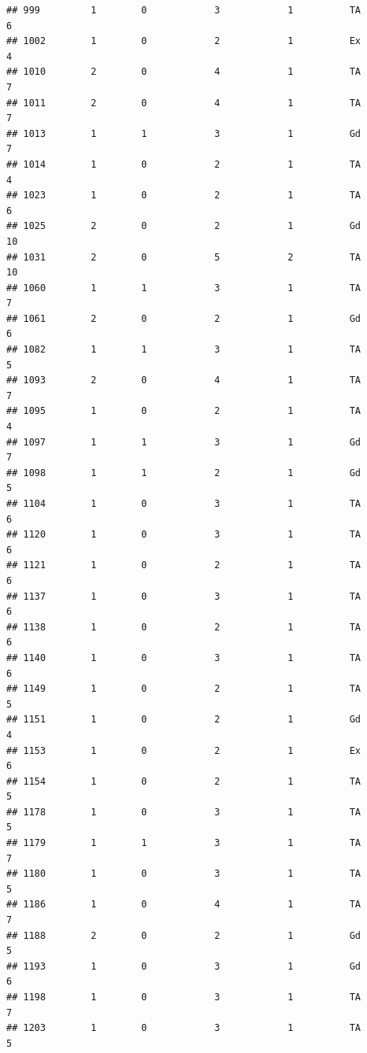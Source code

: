 \documentclass[]{article}
\begin{document}
\begin{verbatim}
## 999         1        0            3            1          TA            6
## 1002        1        0            2            1          Ex            4
## 1010        2        0            4            1          TA            7
## 1011        2        0            4            1          TA            7
## 1013        1        1            3            1          Gd            7
## 1014        1        0            2            1          TA            4
## 1023        1        0            2            1          TA            6
## 1025        2        0            2            1          Gd           10
## 1031        2        0            5            2          TA           10
## 1060        1        1            3            1          TA            7
## 1061        2        0            2            1          Gd            6
## 1082        1        1            3            1          TA            5
## 1093        2        0            4            1          TA            7
## 1095        1        0            2            1          TA            4
## 1097        1        1            3            1          Gd            7
## 1098        1        1            2            1          Gd            5
## 1104        1        0            3            1          TA            6
## 1120        1        0            3            1          TA            6
## 1121        1        0            2            1          TA            6
## 1137        1        0            3            1          TA            6
## 1138        1        0            2            1          TA            6
## 1140        1        0            3            1          TA            6
## 1149        1        0            2            1          TA            5
## 1151        1        0            2            1          Gd            4
## 1153        1        0            2            1          Ex            6
## 1154        1        0            2            1          TA            5
## 1178        1        0            3            1          TA            5
## 1179        1        1            3            1          TA            7
## 1180        1        0            3            1          TA            5
## 1186        1        0            4            1          TA            7
## 1188        2        0            2            1          Gd            5
## 1193        1        0            3            1          Gd            6
## 1198        1        0            3            1          TA            7
## 1203        1        0            3            1          TA            5

\end{verbatim}
\end{document}
